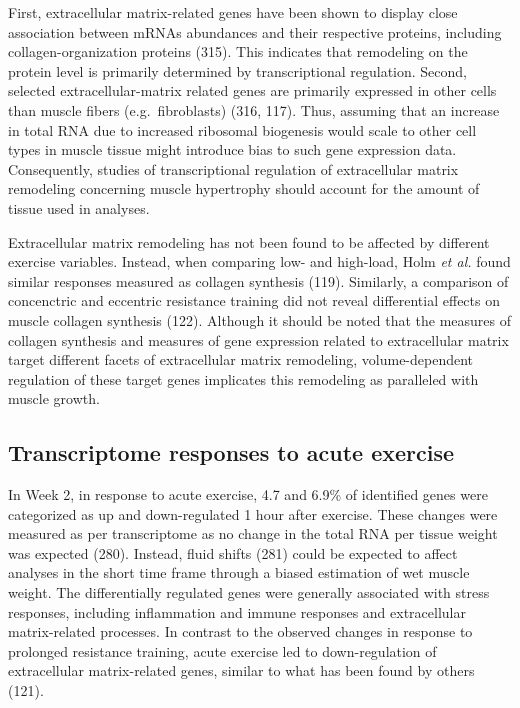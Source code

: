 \documentclass[twoside,10pt]{gihclass} %
\begin{document}
First, extracellular matrix-related genes have been shown to display close association between mRNAs abundances and their respective proteins, including collagen-organization proteins (315).
This indicates that remodeling on the protein level is primarily determined by transcriptional regulation.
Second, selected extracellular-matrix related genes are primarily expressed in other cells than muscle fibers (e.g.~fibroblasts)
(316, 117).
Thus, assuming that an increase in total RNA due to increased ribosomal biogenesis would scale to other cell types in muscle tissue might introduce bias to such gene expression data.
Consequently, studies of transcriptional regulation of extracellular matrix remodeling concerning muscle hypertrophy should account for the amount of tissue used in analyses.

Extracellular matrix remodeling has not been found to be affected by different exercise variables. Instead, when comparing low- and high-load, Holm \emph{et al.} found similar responses measured as collagen synthesis (119).
Similarly, a comparison of concenctric and eccentric resistance training did not reveal differential effects on muscle collagen synthesis
(122).
Although it should be noted that the measures of collagen synthesis and measures of gene expression related to extracellular matrix target different facets of extracellular matrix remodeling, volume-dependent regulation of these target genes implicates this remodeling as paralleled with muscle growth.

\hypertarget{transcriptome-responses-to-acute-exercise}{%
\subsection{Transcriptome responses to acute exercise}\label{transcriptome-responses-to-acute-exercise}}

In Week 2, in response to acute exercise, 4.7 and 6.9\% of identified genes were categorized as up and down-regulated 1 hour after exercise.
These changes were measured as per transcriptome as no change in the total RNA per tissue weight was expected
(280).
Instead, fluid shifts (281)
could be expected to affect analyses in the short time frame through a biased estimation of wet muscle weight.
The differentially regulated genes were generally associated with stress responses, including inflammation and immune responses and extracellular matrix-related processes. In contrast to the observed changes in response to prolonged resistance training, acute exercise led to down-regulation of extracellular matrix-related genes, similar to what has been found by others (121).
\end{document}

